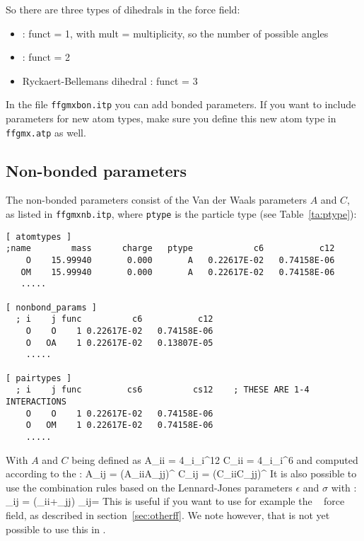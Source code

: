 So there are three types of dihedrals in the {\gromacs} force field:
\begin{itemize}
\item {} : funct = 1, with mult = multiplicity, so the
                                   number of possible angles
\item {} : funct = 2
\item Ryckaert-Bellemans dihedral : funct = 3
\end{itemize}
In the file \verb'ffgmxbon.itp' you can add bonded parameters. If you
want to include parameters for new atom types, make sure you define
this new atom type in \verb'ffgmx.atp' as well.

\subsection{Non-bonded parameters}
\label{subsec:nbpar}
The non-bonded parameters consist of the Van der Waals parameters
$A$ and $C$, as listed in \verb'ffgmxnb.itp', where {\tt ptype} is the
particle type (see Table~\ref{ta:ptype}):
{\small\begin{verbatim}
[ atomtypes ]
;name        mass      charge   ptype            c6           c12
    O    15.99940       0.000       A   0.22617E-02   0.74158E-06
   OM    15.99940       0.000       A   0.22617E-02   0.74158E-06
   .....

[ nonbond_params ]
  ; i    j func          c6           c12
    O    O    1 0.22617E-02   0.74158E-06
    O   OA    1 0.22617E-02   0.13807E-05
    .....

[ pairtypes ]
  ; i    j func         cs6          cs12    ; THESE ARE 1-4 INTERACTIONS
    O    O    1 0.22617E-02   0.74158E-06
    O   OM    1 0.22617E-02   0.74158E-06
    .....
\end{verbatim}}
With $A$ and $C$ being defined as
\beq
	A_{ii} = 4\epsilon_i\sigma_i^{12}
\eeq
\beq
	C_{ii} = 4\epsilon_i\sigma_i^{6}
\eeq
and computed according to the  :
\beq
	A_{ij} = (A_{ii}A_{jj})^{}
\eeq
\beq
	C_{ij} = (C_{ii}C_{jj})^{}
\eeq
It is also possible to use the combination rules based on the
Lennard-Jones parameters $\epsilon$ and $\sigma$ with : 
\beq
 	\sigma_{ij} = (\sigma_{ii}+\sigma_{jj})
\eeq
\beq
 	\epsilon_{ij}=
\eeq
This is useful if you want to use for example the
~\cite{Jorgensen88} force field, as described in
section~\ref{sec:otherff}. We note however, that is not yet possible
to use this in {\gromacs} {\gmxver}.

